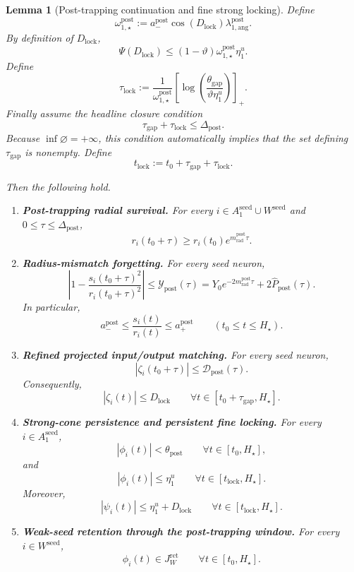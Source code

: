 \documentclass{article} %
\theoremstyle{plain}
\newtheorem{lemma}[theorem]{Lemma}
\theoremstyle{definition}
\theoremstyle{remark}
\begin{document}
\begin{lemma}[Post-trapping continuation and fine strong locking]

Define
\[
\boxed{
\omega_{1,\star}^{\mathrm{post}}
:=
a_-^{\mathrm{post}}\cos(D_{\mathrm{lock}})
\lambda_{1,\mathrm{ang}}^{\mathrm{post}}.
}
\]
By definition of $D_{\mathrm{lock}}$,
\[
\boxed{
\Psi(D_{\mathrm{lock}})
\le
(1-\vartheta)\omega_{1,\star}^{\mathrm{post}}\eta_1^u.
}
\]
Define
\[
\boxed{
\tau_{\mathrm{lock}}
:=
\frac1{\omega_{1,\star}^{\mathrm{post}}}
\left[
\log\left(\frac{\theta_{\mathrm{gap}}}{\vartheta\eta_1^u}\right)
\right]_+.
}
\]
Finally assume the headline closure condition
\[
\boxed{
\tau_{\mathrm{gap}}+\tau_{\mathrm{lock}}
\le
\Delta_{\mathrm{post}}.
}
\]
Because $\inf\varnothing=+\infty$, this condition automatically implies
that the set defining $\tau_{\mathrm{gap}}$ is nonempty.  Define
\[
\boxed{
t_{\mathrm{lock}}
:=
t_0+\tau_{\mathrm{gap}}+\tau_{\mathrm{lock}}.
}
\]

Then the following hold.
\begin{enumerate}[label=\textnormal{(\roman*)},leftmargin=2.4em]
\item \textbf{Post-trapping radial survival.}
For every $i\in A_1^{\mathrm{seed}}\cup W^{\mathrm{seed}}$ and
$0\le\tau\le\Delta_{\mathrm{post}}$,
\[
\boxed{
r_i(t_0+\tau)
\ge
r_i(t_0)e^{m_{\mathrm{rad}}^{\mathrm{post}}\tau}.
}
\]

\item \textbf{Radius-mismatch forgetting.}
For every seed neuron,
\[
\boxed{
\left|1-\frac{s_i(t_0+\tau)^2}{r_i(t_0+\tau)^2}\right|
\le
\mathcal Y_{\mathrm{post}}(\tau)
=
Y_0e^{-2m_{\mathrm{rad}}^{\mathrm{post}}\tau}
+2\widehat P_{\mathrm{post}}(\tau).
}
\]
In particular,
\[
\boxed{
a_-^{\mathrm{post}}
\le
\frac{s_i(t)}{r_i(t)}
\le
a_+^{\mathrm{post}}}
\qquad(t_0\le t\le H_\star).
\]

\item \textbf{Refined projected input/output matching.}
For every seed neuron,
\[
\boxed{
|\zeta_i(t_0+\tau)|\le\mathcal D_{\mathrm{post}}(\tau).
}
\]
Consequently,
\[
\boxed{
|\zeta_i(t)|\le D_{\mathrm{lock}}}
\qquad
\forall t\in[t_0+\tau_{\mathrm{gap}},H_\star].
\]

\item \textbf{Strong-cone persistence and persistent fine locking.}
For every $i\in A_1^{\mathrm{seed}}$,
\[
\boxed{|\phi_i(t)|<\theta_{\mathrm{post}}}
\qquad
\forall t\in[t_0,H_\star],
\]
and
\[
\boxed{|\phi_i(t)|\le\eta_1^u}
\qquad
\forall t\in[t_{\mathrm{lock}},H_\star].
\]
Moreover,
\[
\boxed{|\psi_i(t)|\le\eta_1^u+D_{\mathrm{lock}}}
\qquad
\forall t\in[t_{\mathrm{lock}},H_\star].
\]

\item \textbf{Weak-seed retention through the post-trapping window.}
For every $i\in W^{\mathrm{seed}}$,
\[
\boxed{\phi_i(t)\in J_W^{\mathrm{ret}}}
\qquad
\forall t\in[t_0,H_\star].
\]
\end{enumerate}
\end{lemma}
\end{document}
